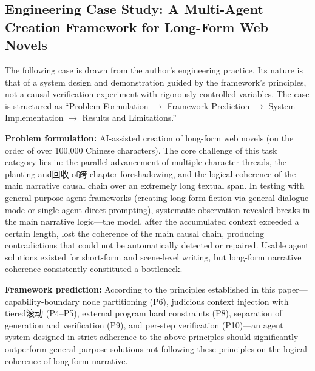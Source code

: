 \documentclass[11pt,a4paper]{article}
\theoremstyle{definition}
\begin{document}
\subsection{Engineering Case Study: A Multi-Agent Creation Framework for Long-Form Web Novels}
\label{sec:case}

The following case is drawn from the author's engineering practice. Its nature is that of a system design and demonstration guided by the framework's principles, not a causal-verification experiment with rigorously controlled variables. The case is structured as ``Problem Formulation $\to$ Framework Prediction $\to$ System Implementation $\to$ Results and Limitations.''

\textbf{Problem formulation:} AI-assisted creation of long-form web novels (on the order of over 100,000 Chinese characters). The core challenge of this task category lies in: the parallel advancement of multiple character threads, the planting and回收 of跨-chapter foreshadowing, and the logical coherence of the main narrative causal chain over an extremely long textual span. In testing with general-purpose agent frameworks (creating long-form fiction via general dialogue mode or single-agent direct prompting), systematic observation revealed breaks in the main narrative logic---the model, after the accumulated context exceeded a certain length, lost the coherence of the main causal chain, producing contradictions that could not be automatically detected or repaired. Usable agent solutions existed for short-form and scene-level writing, but long-form narrative coherence consistently constituted a bottleneck.

\textbf{Framework prediction:} According to the principles established in this paper---capability-boundary node partitioning (P6), judicious context injection with tiered滚动 (P4--P5), external program hard constraints (P8), separation of generation and verification (P9), and per-step verification (P10)---an agent system designed in strict adherence to the above principles should significantly outperform general-purpose solutions not following these principles on the logical coherence of long-form narrative.
\end{document}
